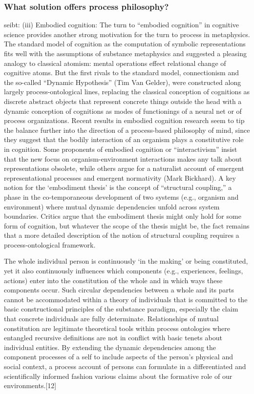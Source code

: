 \subsubsection{What solution offers process philosophy?}
seibt:
(iii) Embodied cognition: The turn to “embodied cognition” in cognitive science provides another strong motivation for the turn to process in metaphysics. The standard model of cognition as the computation of symbolic representations fits well with the assumptions of substance metaphysics and suggested a pleasing analogy to classical atomism: mental operations effect relational change of cognitive atoms. But the first rivals to the standard model, connectionism and the so-called “Dynamic Hypothesis” (Tim Van Gelder), were constructed along largely process-ontological lines, replacing the classical conception of cognitions as discrete abstract objects that represent concrete things outside the head with a dynamic conception of cognitions as modes of functionings of a neural net or of process organizations. Recent results in embodied cognition research seem to tip the balance further into the direction of a process-based philosophy of mind, since they suggest that the bodily interaction of an organism plays a constitutive role in cognition. Some proponents of embodied cognition or “interactivism” insist that the new focus on organism-environment interactions makes any talk about representations obsolete, while others argue for a naturalist account of emergent representational processes and emergent normativity (Mark Bickhard). A key notion for the ‘embodiment thesis’ is the concept of “structural coupling,” a phase in the co-temporaneous development of two systems (e.g., organism and environment) where mutual dynamic dependencies unfold across system boundaries. Critics argue that the embodiment thesis might only hold for some form of cognition, but whatever the scope of the thesis might be, the fact remains that a more detailed description of the notion of structural coupling requires a process-ontological framework.

The whole individual person is continuously ‘in the making’ or being constituted, yet it also continuously influences which components (e.g., experiences, feelings, actions) enter into the constitution of the whole and in which ways these components occur. Such circular dependencies between a whole and its parts cannot be accommodated within a theory of individuals that is committed to the basic constructional principles of the substance paradigm, especially the claim that concrete individuals are fully determinate. Relationships of mutual constitution are legitimate theoretical tools within process ontologies where entangled recursive definitions are not in conflict with basic tenets about individual entities. By extending the dynamic dependencies among the component processes of a self to include aspects of the person's physical and social context, a process account of persons can formulate in a differentiated and scientifically informed fashion various claims about the formative role of our environments.[12]



